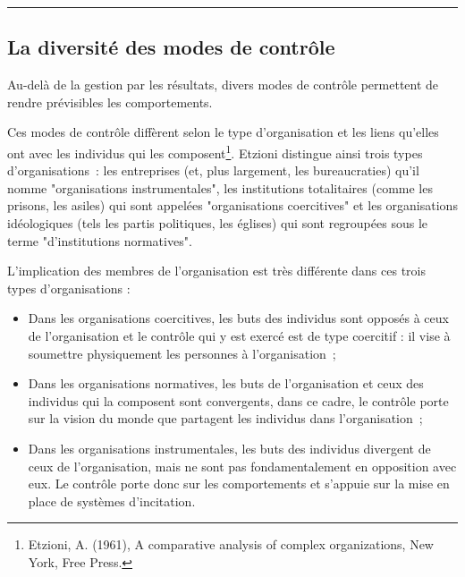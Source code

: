 \documentclass[oneside]{kaobook}
\begin{document}
\noindent\rule{\textwidth}{0.5pt}

\subsection{La diversité des modes de contrôle}
\label{sec:orgb236742}
Au-delà de la gestion par les résultats, divers modes de contrôle permettent de rendre prévisibles les comportements. 

Ces modes de contrôle diffèrent selon le type d'organisation et les liens qu'elles ont avec les individus qui les composent\footnote{Etzioni, A. (1961), A comparative analysis of complex organizations, New York, Free Press.}. Etzioni distingue ainsi trois types d'organisations : les entreprises (et, plus largement, les bureaucraties) qu'il nomme "organisations instrumentales", les institutions totalitaires (comme les prisons, les asiles) qui sont appelées "organisations coercitives" et les organisations idéologiques (tels les partis politiques, les églises) qui sont regroupées sous le terme "d'institutions normatives".

L'implication des membres de l'organisation est très différente dans ces trois types d'organisations :
\begin{itemize}
\item Dans les organisations coercitives, les buts des individus sont opposés à ceux de l'organisation et le contrôle qui y est exercé est de type coercitif : il vise à soumettre physiquement les personnes à l'organisation ;
\item Dans les organisations normatives, les buts de l'organisation et ceux des individus qui la composent sont convergents, dans ce cadre, le contrôle porte sur la vision du monde que partagent les individus dans l'organisation ;
\item Dans les organisations instrumentales, les buts des individus divergent de ceux de l'organisation, mais ne sont pas fondamentalement en opposition avec eux. Le contrôle porte donc sur les comportements et s'appuie sur la mise en place de systèmes d'incitation.
\end{itemize}
\end{document}
